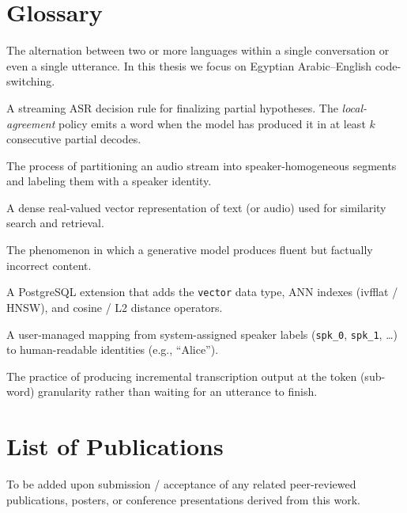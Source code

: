 \documentclass[12pt,a4paper,oneside]{book}
\theoremstyle{plain}
\theoremstyle{definition}
\theoremstyle{remark}
\begin{document}
\chapter*{Glossary}

\begin{description}[itemsep=0.2em,leftmargin=3.5cm,style=nextline]
  \item[Code-switching] The alternation between two or more languages within a
  single conversation or even a single utterance. In this thesis we focus on
  Egyptian Arabic--English code-switching.
  \item[Commit policy] A streaming ASR decision rule for finalizing partial
  hypotheses. The \emph{local-agreement} policy emits a word when the model
  has produced it in at least $k$ consecutive partial decodes.
  \item[Diarization] The process of partitioning an audio stream into
  speaker-homogeneous segments and labeling them with a speaker identity.
  \item[Embedding] A dense real-valued vector representation of text (or audio)
  used for similarity search and retrieval.
  \item[Hallucination] The phenomenon in which a generative model produces
  fluent but factually incorrect content.
  \item[pgvector] A PostgreSQL extension that adds the \texttt{vector} data
  type, ANN indexes (ivfflat / HNSW), and cosine / L2 distance operators.
  \item[Speaker map] A user-managed mapping from system-assigned speaker labels
  (\texttt{spk\_0}, \texttt{spk\_1}, \ldots) to human-readable identities
  (e.g., ``Alice'').
  \item[Token-level streaming] The practice of producing incremental
  transcription output at the token (sub-word) granularity rather than
  waiting for an utterance to finish.
\end{description}

\chapter*{List of Publications}

To be added upon submission / acceptance of any related peer-reviewed
publications, posters, or conference presentations derived from this work.
\end{document}
